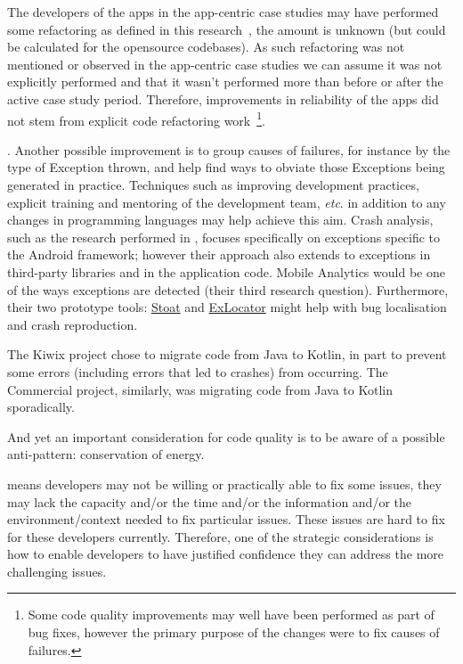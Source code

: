 The developers of the apps in the app-centric case studies may have performed some refactoring as defined in this research~\citep{Hamdi2021empirical}, the amount is unknown (but could be calculated for the opensource codebases). As such refactoring was not mentioned or observed in the app-centric case studies we can assume it was not explicitly performed and that it wasn't performed more than before or after the active case study period. Therefore, improvements in reliability of the apps did not stem from explicit code refactoring work~\footnote{Some code quality improvements may well have been performed as part of bug fixes, however the primary purpose of the changes were to fix causes of failures.}.

. 
Another possible improvement is to group causes of failures, for instance by the type of Exception thrown, and help find ways to obviate those Exceptions being generated in practice. Techniques such as improving development practices, explicit training and mentoring of the development team, \emph{etc}. in addition to any changes in programming languages may help achieve this aim. %
Crash analysis, such as the research performed in \citet{su2020_why_my_app_crashes_etc_android_framework_exceptions}, focuses specifically on exceptions specific to the Android framework; however their approach also extends to exceptions in third-party libraries and in the application code. Mobile Analytics would be one of the ways exceptions are detected (their third research question). Furthermore, their two prototype tools: \href{https://github.com/tingsu/Stoat}{Stoat} and \href{https://github.com/crashanalysis/ExLocator}{ExLocator} might help with bug localisation and crash reproduction.

The Kiwix project chose to migrate code from Java to Kotlin, in part to prevent some errors (including errors that led to crashes) from occurring. The Commercial project, similarly, was migrating code from Java to Kotlin sporadically.


And yet an important consideration for code quality is to be aware of a possible anti-pattern: conservation of energy.

means developers may not be willing or practically able to fix some issues, they may lack the capacity and/or the time and/or the information and/or the environment/context needed to fix particular issues. These issues are hard to fix for these developers currently.
%
Therefore, one of the strategic considerations is how to enable developers to have justified confidence they can address the more challenging issues.

